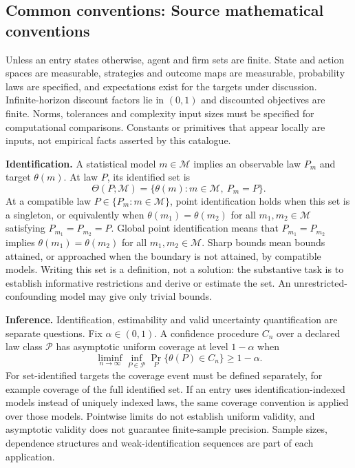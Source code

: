 \documentclass[11pt,a4paper]{article}
\begin{document}
\subsection*{Common conventions: Source mathematical conventions}

Unless an entry states otherwise, agent and firm sets are finite. State and action spaces are measurable, strategies and outcome maps are measurable, probability laws are specified, and expectations exist for the targets under discussion. Infinite-horizon discount factors lie in $(0,1)$ and discounted objectives are finite. Norms, tolerances and complexity input sizes must be specified for computational comparisons. Constants or primitives that appear locally are inputs, not empirical facts asserted by this catalogue.

\textbf{Identification.} A statistical model $m\in\mathcal M$ implies an observable law $P_m$ and target $\theta(m)$. At law $P$, its identified set is
\[
\Theta(P;\mathcal M)=\{\theta(m):m\in\mathcal M,\ P_m=P\}.
\]
At a compatible law $P\in\{P_m:m\in\mathcal M\}$, point identification holds when this set is a singleton, or equivalently when $\theta(m_1)=\theta(m_2)$ for all $m_1,m_2\in\mathcal M$ satisfying $P_{m_1}=P_{m_2}=P$. Global point identification means that $P_{m_1}=P_{m_2}$ implies $\theta(m_1)=\theta(m_2)$ for all $m_1,m_2\in\mathcal M$. Sharp bounds mean bounds attained, or approached when the boundary is not attained, by compatible models. Writing this set is a definition, not a solution: the substantive task is to establish informative restrictions and derive or estimate the set. An unrestricted-confounding model may give only trivial bounds.

\textbf{Inference.} Identification, estimability and valid uncertainty quantification are separate questions. Fix $\alpha\in(0,1)$. A confidence procedure $C_n$ over a declared law class $\mathcal P$ has asymptotic uniform coverage at level $1-\alpha$ when
\[
\liminf_{n\to\infty}\inf_{P\in\mathcal P}\Pr_P\{\theta(P)\in C_n\}\geq1-\alpha.
\]
For set-identified targets the coverage event must be defined separately, for example coverage of the full identified set. If an entry uses identification-indexed models instead of uniquely indexed laws, the same coverage convention is applied over those models. Pointwise limits do not establish uniform validity, and asymptotic validity does not guarantee finite-sample precision. Sample sizes, dependence structures and weak-identification sequences are part of each application.
\end{document}
